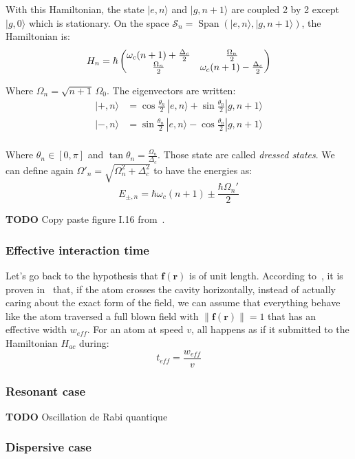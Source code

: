 \documentclass[10pt]{report}
\theoremstyle{plain}
\theoremstyle{definition}
\theoremstyle{remark}
\newcommand{\TODO}{\textbf{TODO}}
\newcommand{\ket}[1]{|#1\rangle}
\newcommand{\mat}[1]{\begin{pmatrix}#1\end{pmatrix}}
\newcommand{\bs}{\boldsymbol}
\DeclareMathOperator{\Span}{Span}
\newcommand{\twoline}{\vphantom{\frac\int\int}}
\begin{document}
With this Hamiltonian, the state $\ket{e,n}$ and $\ket{g,n+1}$ are coupled 2 by
2 except $\ket{g,0}$ which is stationary. On the space $\mathcal{S}_n =
\Span(\ket{e,n},\ket{g,n+1})$, the Hamiltonian is:
\[\twoline H_n = \hbar \mat{\omega_c(n+1) + \frac{\Delta_c}2& \frac{\Omega_n}2\\
    \frac{\Omega_n}2&\omega_c(n+1) - \frac{\Delta_c}2}\]

Where $\Omega_n = \sqrt{n+1} \,\Omega_0$. The eigenvectors are written:
\newcommand{\tnt}{\frac{\theta_n}2}
\begin{align*}
  \ket{+,n} &= \cos \tnt \,\ket{e,n} + \sin \tnt \ket{g,n+1}\\
  \ket{-,n} &= \sin \tnt \,\ket{e,n} - \cos \tnt \ket{g,n+1}\\
\end{align*}

\vspace{-0.5cm}

Where $\theta_n \in [0,\pi]$ and $\tan \theta_n = \frac {\Omega_n}{\Delta_c}$.
Those state are called \emph{dressed states}.
We can define again $\Omega'_n = \sqrt{\Omega_n^2 + \Delta_c^2}$ to have the energies as:
\[E_{\pm,n} = \hbar \omega_c(n+1) \pm \frac{\hbar \Omega_n'}2\]

\TODO{} Copy paste figure I.16 from~\cite{SayPHD11}.

\subsubsection{Effective interaction time}
\newcommand{\eff}{_{e\!f\!\!f}}

Let's go back to the hypothesis that $\bs f(\bs r)$ is of unit length. According
to~\cite{SayPHD11}, it is proven in~\cite{Har06} that, if the atom crosses the
cavity horizontally, instead of actually caring about the exact form of the
field, we can assume that everything behave like the atom traversed a full blown
field with $\|\bs f(\bs r)\| = 1$ that has an effective width $w\eff$. For an
atom at speed $v$, all happens as if it submitted to the Hamiltonian $H_{ac}$
during:
\[t\eff = \frac{w\eff}v\]

\subsubsection{Resonant case}

\TODO{} Oscillation de Rabi quantique

\subsubsection{Dispersive case}
\end{document}
